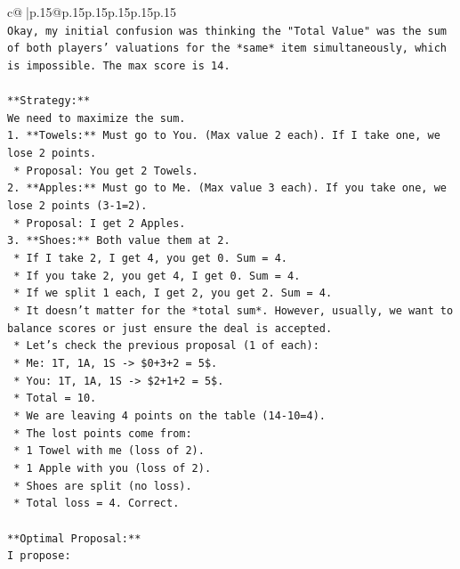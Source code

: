 \documentclass{article}
\begin{document}
{\begin{supertabular}{c@{$\;$}|p{.15\linewidth}@{}p{.15\linewidth}p{.15\linewidth}p{.15\linewidth}p{.15\linewidth}p{.15\linewidth}}
{{{\\ 
\texttt{Okay, my initial confusion was thinking the "Total Value" was the sum of both players' valuations for the *same* item simultaneously, which is impossible. The max score is 14.} \\
\\ 
\texttt{**Strategy:**} \\
\texttt{We need to maximize the sum.} \\
\texttt{1.  **Towels:** Must go to You. (Max value 2 each). If I take one, we lose 2 points.} \\
\texttt{    *   Proposal: You get 2 Towels.} \\
\texttt{2.  **Apples:** Must go to Me. (Max value 3 each). If you take one, we lose 2 points (3{-}1=2).} \\
\texttt{    *   Proposal: I get 2 Apples.} \\
\texttt{3.  **Shoes:** Both value them at 2.} \\
\texttt{    *   If I take 2, I get 4, you get 0. Sum = 4.} \\
\texttt{    *   If you take 2, you get 4, I get 0. Sum = 4.} \\
\texttt{    *   If we split 1 each, I get 2, you get 2. Sum = 4.} \\
\texttt{    *   It doesn't matter for the *total sum*. However, usually, we want to balance scores or just ensure the deal is accepted.} \\
\texttt{    *   Let's check the previous proposal (1 of each):} \\
\texttt{        *   Me: 1T, 1A, 1S {-}> \$0+3+2 = 5\$.} \\
\texttt{        *   You: 1T, 1A, 1S {-}> \$2+1+2 = 5\$.} \\
\texttt{        *   Total = 10.} \\
\texttt{        *   We are leaving 4 points on the table (14{-}10=4).} \\
\texttt{        *   The lost points come from:} \\
\texttt{            *   1 Towel with me (loss of 2).} \\
\texttt{            *   1 Apple with you (loss of 2).} \\
\texttt{            *   Shoes are split (no loss).} \\
\texttt{            *   Total loss = 4. Correct.} \\
\\ 
\texttt{**Optimal Proposal:**} \\
\texttt{I propose:} \\
}}}
\end{supertabular}}
\end{document}
